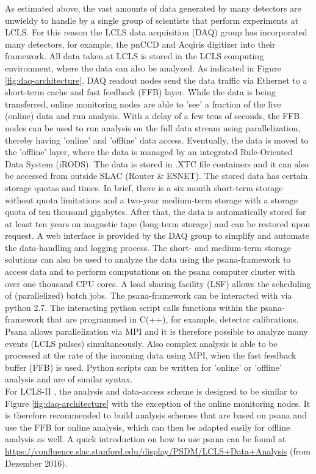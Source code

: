 As estimated above, the vast amounts of data generated by many detectors are unwieldy to handle by a single group of scientists that perform experiments at LCLS. For this reason the LCLS data acquisition (DAQ) group has incorporated many detectors, for example, the pnCCD and Acqiris digitizer into their framework. All data taken at LCLS is stored in the LCLS computing environment, where the data can also be analyzed. As indicated in Figure \ref{fig:daq-architecture}, DAQ readout nodes send the data traffic via Ethernet to a short-term cache and fast feedback (FFB) layer. While the data is being transferred, online monitoring nodes are able to 'see' a fraction of the live (online) data and run analysis. With a delay of a few tens of seconds, the FFB nodes can be used to run analysis on the full data stream using parallelization, thereby having 'online' and 'offline' data access. Eventually, the data is moved to the 'offline' layer, where the data is managed by an integrated Rule-Oriented Data System (iRODS). The data is stored in .XTC file containers and it can also be accessed from outside SLAC (Router \& ESNET). The stored data has certain storage quotas and times. In brief, there is a six month short-term storage without quota limitations and a two-year medium-term storage with a storage quota of ten thousand gigabytes. After that, the data is automatically stored for at least ten years on magnetic tape (long-term storage) and can be restored upon request. A web interface is provided by the DAQ group to simplify and automate the data-handling and logging process. The short- and medium-term storage solutions can also be used to analyze the data using the psana-framework to access data and to perform computations on the psana computer cluster with over one thousand CPU cores. A load sharing facility (LSF) allows the scheduling of (parallelized) batch jobs. The psana-framework can be interacted with via python 2.7. The interacting python script calls functions within the psana-framework that are programmed in C(++), for example, detector calibrations. Psana allows parallelization via MPI and it is therefore possible to analyze many events (LCLS pulses) simultaneously. Also complex analysis is able to be processed at the rate of the incoming data using MPI, when the fast feedback buffer (FFB) is used. Python scripts can be written for 'online' or 'offline' analysis and are of similar syntax.\\[1\baselineskip]
%
For LCLS-II \citep{Amadeo-2016-SLAC}, the analysis and data-access scheme is designed to be similar to Figure \ref{fig:daq-architecture} with the exception of the online monitoring nodes. It is therefore recommended to build analysis schemes that are based on psana and use the FFB for online analysis, which can then be adapted easily for offline analysis as well. A quick introduction on how to use psana can be found at \url{https://confluence.slac.stanford.edu/display/PSDM/LCLS+Data+Analysis} (from Dezember 2016).
%
%
%
